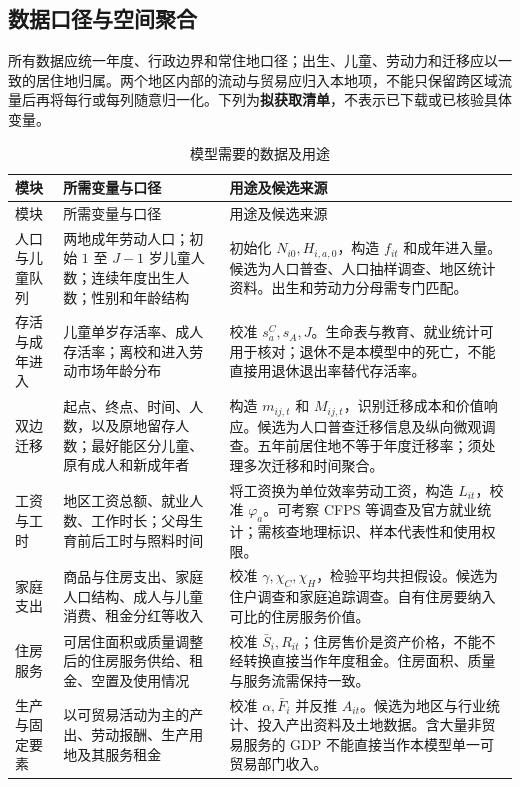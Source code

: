 \documentclass[UTF8,a4paper,zihao=-4,fontset=windows]{ctexart}
\numberwithin{equation}{section}
\begin{document}
\subsection{数据口径与空间聚合}
所有数据应统一年度、行政边界和常住地口径；出生、儿童、劳动力和迁移应以一致的居住地归属。两个地区内部的流动与贸易应归入本地项，不能只保留跨区域流量后再将每行或每列随意归一化。下列为\textbf{拟获取清单}，不表示已下载或已核验具体变量。

\small
\begin{longtable}{L{0.16\textwidth}L{0.34\textwidth}L{0.40\textwidth}}
\caption{模型需要的数据及用途}\label{tab:data}\\
\toprule
模块 & 所需变量与口径 & 用途及候选来源\\
\midrule
\endfirsthead
\toprule
模块 & 所需变量与口径 & 用途及候选来源\\
\midrule
\endhead
\bottomrule
\endfoot
人口与儿童队列 & 两地成年劳动人口；初始 $1$ 至 $J-1$ 岁儿童人数；连续年度出生人数；性别和年龄结构 & 初始化 $N_{i0},H_{i,a,0}$，构造 $f_{it}$ 和成年进入量。候选为人口普查、人口抽样调查、地区统计资料。出生和劳动力分母需专门匹配。\\
存活与成年进入 & 儿童单岁存活率、成人存活率；离校和进入劳动市场年龄分布 & 校准 $s^C_a,s_A,J$。生命表与教育、就业统计可用于核对；退休不是本模型中的死亡，不能直接用退休退出率替代存活率。\\
双边迁移 & 起点、终点、时间、人数，以及原地留存人数；最好能区分儿童、原有成人和新成年者 & 构造 $m_{ij,t}$ 和 $M_{ij,t}$，识别迁移成本和价值响应。候选为人口普查迁移信息及纵向微观调查。五年前居住地不等于年度迁移率；须处理多次迁移和时间聚合。\\
工资与工时 & 地区工资总额、就业人数、工作时长；父母生育前后工时与照料时间 & 将工资换为单位效率劳动工资，构造 $L_{it}$，校准 $\varphi_a$。可考察 CFPS 等调查及官方就业统计；需核查地理标识、样本代表性和使用权限。\\
家庭支出 & 商品与住房支出、家庭人口结构、成人与儿童消费、租金分红等收入 & 校准 $\gamma,\chi_C,\chi_H$，检验平均共担假设。候选为住户调查和家庭追踪调查。自有住房要纳入可比的住房服务价值。\\
住房服务 & 可居住面积或质量调整后的住房服务供给、租金、空置及使用情况 & 校准 $\bar S_i,R_{it}$；住房售价是资产价格，不能不经转换直接当作年度租金。住房面积、质量与服务流需保持一致。\\
生产与固定要素 & 以可贸易活动为主的产出、劳动报酬、生产用地及其服务租金 & 校准 $\alpha,\bar F_i$ 并反推 $A_{it}$。候选为地区与行业统计、投入产出资料及土地数据。含大量非贸易服务的 GDP 不能直接当作本模型单一可贸易部门收入。\\

\end{longtable}
\end{document}
